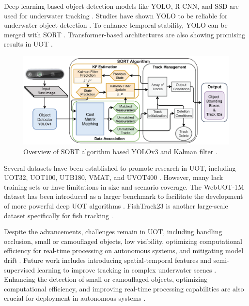 Deep learning-based object detection models like YOLO, R-CNN, and SSD are used for underwater tracking \cite{lotfi2024comparison, elmezain2025advancing}. Studies have shown YOLO to be reliable for underwater object detection \cite{lotfi2024comparison}. To enhance temporal stability, YOLO can be merged with SORT \cite{lotfi2024comparison}. Transformer-based architectures are also showing promising results in UOT \cite{mathias2022occlusion}.
\begin{figure}[ht]
    \centering
    \includegraphics[width=1\linewidth]{images/deepsort.png}
    \caption{Overview of SORT algorithm based YOLOv3 and Kalman filter \cite{pereira2022sort}.}
\end{figure}

Several datasets have been established to promote research in UOT, including UOT32, UOT100, UTB180, VMAT, and UVOT400 \cite{zhang2024webuot, qiu2024boundary, rout2019walsh}. However, many lack training sets or have limitations in size and scenario coverage. The WebUOT-1M dataset has been introduced as a larger benchmark to facilitate the development of more powerful deep UOT algorithms \cite{zhang2024webuot}. FishTrack23 is another large-scale dataset specifically for fish tracking \cite{elmezain2025advancing}.

Despite the advancements, challenges remain in UOT, including handling occlusion, small or camouflaged objects, low visibility, optimizing computational efficiency for real-time processing on autonomous systems, and mitigating model drift \cite{qiu2024boundary, mathias2022occlusion, zhang2024webuot, lin2024motion}. Future work includes introducing spatial-temporal features and semi-supervised learning to improve tracking in complex underwater scenes \cite{qiu2024boundary, mathias2022occlusion}. Enhancing the detection of small or camouflaged objects, optimizing computational efficiency, and improving real-time processing capabilities are also crucial for deployment in autonomous systems \cite{elmezain2025advancing}.





